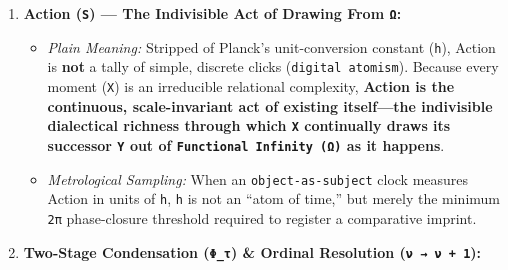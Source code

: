 \documentclass[
]{article}
\begin{document}
\begin{enumerate}
  \begin{itemize}
  \item
    \emph{Plain Meaning:} \textbf{``The universe obeying itself.''}
    \texttt{Ω(X)} is not a separate computational pause or a passive
    catalog of abstract possibilities waiting to be consulted. Rather,
    \emph{by the mere fact of existing}, \texttt{X} perpetually
    processes a vast web of simultaneous relational arrivals across its
    horizon (such as two independent photons arriving from different
    sources at once) \textbf{while} transmuting into \texttt{Y}.
  \item
    \emph{Spanning Necessity and Probabilistic Determination:}
    \texttt{Ω(X)} is the active, continuous ontological structure
    spanning the chasm between \textbf{what necessarily follows} (strict
    conservation across \texttt{X} and all simultaneous interactions)
    and \textbf{what may follow}---comprising the real
    \textbf{probabilistic determination} across whole, competing
    successor states \texttt{\textquotesingle{}Y\_n} (e.g., for a pure
    coin flip \texttt{X}, \texttt{\textquotesingle{}Y\_1~=~Heads} at
    \texttt{50\%} odds of existence and
    \texttt{\textquotesingle{}Y\_2~=~Tails} at \texttt{50\%} odds of
    existence) enacted \emph{within} the seamless transition into
    \texttt{Y}. \texttt{Ω(X)} is \emph{unbounded} across ongoing history
    yet \emph{strictly finite} at every resolution
    (\texttt{1~≤~Ω(X)~\textless{}~∞}).
  \end{itemize}
\item
  \textbf{Action (\texttt{S}) --- The Indivisible Act of Drawing From
  \texttt{Ω}:}

  \begin{itemize}
  \item
    \emph{Plain Meaning:} Stripped of Planck's unit-conversion constant
    (\texttt{h}), Action is \textbf{not} a tally of simple, discrete
    clicks (\texttt{digital~atomism}). Because every moment (\texttt{X})
    is an irreducible relational complexity, \textbf{Action is the
    continuous, scale-invariant act of existing itself---the indivisible
    dialectical richness through which \texttt{X} continually draws its
    successor \texttt{Y} out of \texttt{Functional~Infinity~(Ω)} as it
    happens}.
  \item
    \emph{Metrological Sampling:} When an \texttt{object-as-subject}
    clock measures Action in units of \texttt{h}, \texttt{h} is not an
    ``atom of time,'' but merely the minimum \texttt{2π} phase-closure
    threshold required to register a comparative imprint.
  \end{itemize}
\item
  \textbf{Two-Stage Condensation (\texttt{Φ\_τ}) \& Ordinal Resolution
  (\texttt{ν~→~ν~+~1}):}


\end{enumerate}
\end{document}

